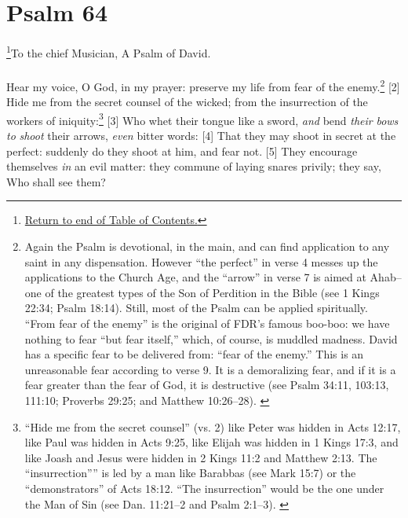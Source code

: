 \chapter{Psalm 64}
\footnote{\textcolor[rgb]{0.00,0.25,0.00}{\hyperlink{TOC}{Return to end of Table of Contents.}}}\textcolor[rgb]{0.00,0.00,1.00}{To the chief Musician, A Psalm of David.}\\
\\
\textcolor[rgb]{0.00,0.00,1.00}{Hear my voice, O God, in my prayer: preserve my life from fear of the enemy.}\footnote{Again the Psalm is devotional, in the main, and can find application to any saint in any dispensation. However ``the perfect'' in verse 4 messes up the applications to the Church Age, and the ``arrow'' in verse 7 is aimed at Ahab--one of the greatest types of the Son of Perdition in the Bible (see 1 Kings 22:34; Psalm 18:14). Still, most of the Psalm can be applied spiritually. ``From fear of the enemy'' is the original of FDR’s famous boo-boo: we have nothing to fear ``but fear itself,'' which, of course, is muddled madness. David has a specific fear to be delivered from: ``fear of the enemy.'' This  is an unreasonable fear according to verse 9. It is a demoralizing fear, and if it is a fear greater than the fear of God, it is destructive (see Psalm 34:11, 103:13, 111:10; Proverbs 29:25; and Matthew 10:26--28). \cite{Ruckman1992Psalms}}
[2] \textcolor[rgb]{0.00,0.00,1.00}{Hide me from the secret counsel of the wicked; from the insurrection of the workers of iniquity:}\footnote{``Hide me from the secret counsel'' (vs. 2) like Peter was hidden in Acts 12:17, like Paul was hidden in Acts 9:25, like Elijah was hidden in 1 Kings 17:3, and like Joash and Jesus were hidden in 2 Kings 11:2 and Matthew 2:13. The ``insurrection''” is led by a man like Barabbas (see Mark 15:7) or the
``demonstrators'' of Acts 18:12. ``The insurrection'' would be the one under the Man of Sin (see Dan. 11:21--2 and Psalm 2:1--3). \cite{Ruckman1992Psalms}}
[3] \textcolor[rgb]{0.00,0.00,1.00}{Who whet their tongue like a sword, \emph{and} bend \emph{their} \emph{bows} \emph{to} \emph{shoot} their arrows, \emph{even} bitter words:}
[4] \textcolor[rgb]{0.00,0.00,1.00}{That they may shoot in secret at the perfect: suddenly do they shoot at him, and fear not.}
[5] \textcolor[rgb]{0.00,0.00,1.00}{They encourage themselves \emph{in} an evil matter: they commune of laying snares privily; they say, Who shall see them?}
